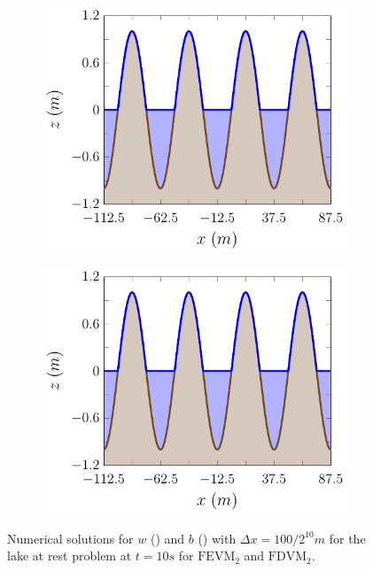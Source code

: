 \begin{figure}
\begin{subfigure}{0.5\textwidth}
	\end{subfigure}
	\begin{subfigure}{0.5\textwidth}
		\includegraphics[width=\textwidth]{./chp5/figures/Analytic/LakeAtRest/Example/FDVMWB.pdf}
	\end{subfigure}%
	\begin{subfigure}{0.5\textwidth}
		\includegraphics[width=\textwidth]{./chp5/figures/Analytic/LakeAtRest/Example/FDVMnWB.pdf}
	\end{subfigure}
	\caption{Numerical solutions for $w$ () and $b$ () with $\Delta x = {100} / {2^{10}}m $ for the lake at rest problem at $t=10s$ for $\text{FEVM}_2$ and $\text{FDVM}_2$.}
	\label{fig:LakeAtRestEx}
\end{figure}

